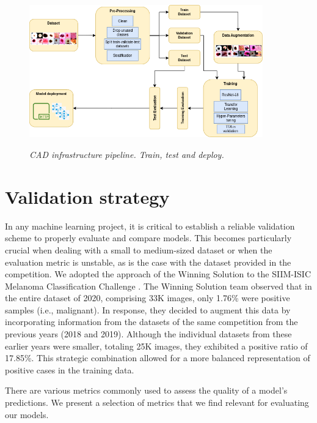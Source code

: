 \begin{figure}[H]
  \centering
  \includegraphics[width=0.9\textwidth]{imatges/methodological_contribution/Pipeline.drawio.png}
  \caption{\textit{CAD infrastructure pipeline. Train, test and deploy. }}
  {\label{fig:cad-pipeline}}
\end{figure}

\section{Validation strategy}

In any machine learning project, it is critical to establish a reliable
validation scheme to properly evaluate and compare models. This becomes
particularly crucial when dealing with a small to medium-sized dataset or when
the evaluation metric is unstable, as is the case with the dataset provided in
the competition. We adopted the approach of the Winning Solution to the
SIIM-ISIC Melanoma Classification Challenge \cite{WinningISIC}. The Winning
Solution team observed that in the entire dataset of 2020, comprising 33K
images, only 1.76\% were positive samples (i.e., malignant). In response, they
decided to augment this data by incorporating information from the datasets of
the same competition from the previous years (2018 and 2019). Although the
individual datasets from these earlier years were smaller, totaling 25K images,
they exhibited a positive ratio of 17.85\%. This strategic combination allowed
for a more balanced representation of positive cases in the training data.


There are various metrics commonly used to assess the quality of a model's
predictions. We present a selection of metrics that we find relevant for
evaluating our models.

